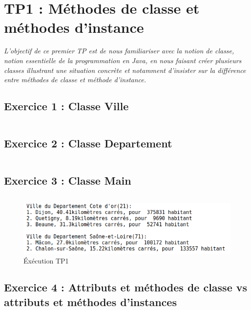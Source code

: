 \chapter{TP1 : Méthodes de classe et méthodes d'instance}
\textit{L’objectif de ce premier TP est de nous familiariser avec la notion de classe, notion essentielle de la programmation en Java, en nous faisant créer plusieurs classes illustrant une situation concrète et notamment d’insister sur la différence entre méthodes de classe et méthode d’instance.}

\section{Exercice 1 : Classe Ville}
\textit{}
\inputminted[linenos,firstline=3,lastline=86]{java}{../sources/src/tp1/Ville.java}

\section{Exercice 2 : Classe Departement}
\textit{}
\inputminted[linenos,firstline=3,lastline=80]{java}{../sources/src/tp1/Departement.java}

\section{Exercice 3 : Classe Main}
\textit{}
\inputminted[linenos,firstline=3,lastline=29]{java}{../sources/src/tp1/Main.java}

\begin{figure}[H]
  \centering
  \includegraphics[width=400pt]{./tp/Pictures/tp1-execute}
  \caption{Éxécution TP1}
  \label{Éxécution TP1}
\end{figure}

\section{Exercice 4 : Attributs et méthodes de classe vs attributs et méthodes d'instances}
\textit{}
